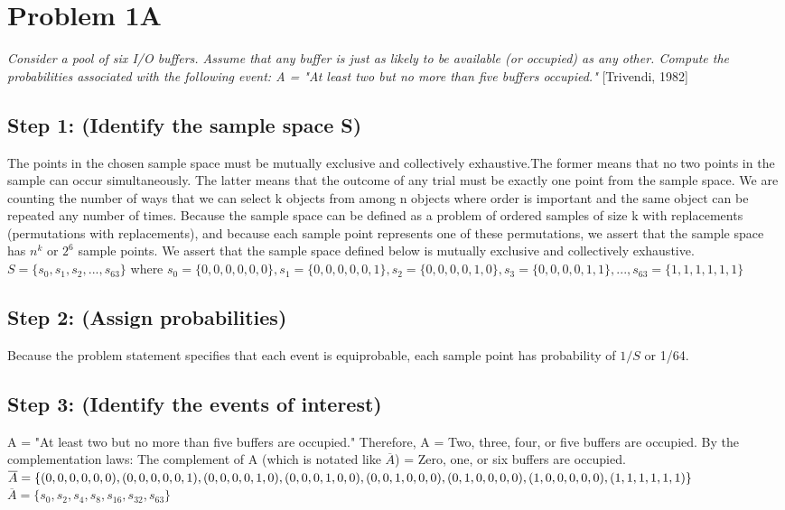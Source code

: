 \documentclass[a4paper,10pt]{article}
\title{}
\author{Mark Johnson \\
Loyola University Chicago}
\date {mjohnson4@luc.edu}
\begin{document}
\maketitle
\section{Problem 1A}
\emph{Consider a pool of six I/O buffers. Assume that any buffer is just as likely to be available (or occupied) as 
any other. Compute the probabilities associated with the following event: \newline
A = "At least two but no more than five buffers occupied."} [Trivendi, 1982]
\subsection{Step 1: (Identify the sample space S)}
The points in the chosen sample space must be mutually exclusive and collectively exhaustive.The former means that no 
two points in the sample can occur simultaneously. The latter means that the outcome of any trial must be exactly one 
point from the sample space. We are counting the number of ways that we can select k objects from among n objects 
where order is important and the same object can be repeated any number of times. Because the sample space can be 
defined as a problem of ordered samples of size k with replacements (permutations with replacements), and because 
each sample point represents one of these permutations, we assert that the sample space has $ n^{k} $ or $ 2^{6} $ 
sample points. We assert that the sample space defined below is mutually exclusive and collectively exhaustive. 
\newline
$ S = \{s_{0}, s_{1}, s_{2},..., s_{63}\} $ where \newline
$ s_{0} = \{0,0,0,0,0,0\}, s_{1} = \{0,0,0,0,0,1\}, s_{2} = \{0,0,0,0,1,0\}, s_{3} = \{0,0,0,0,1,1\},..., s_{63} = 
\{1,1,1,1,1,1\} $
\subsection{Step 2: (Assign probabilities)}
Because the problem statement specifies that each event is equiprobable, each sample point has probability of $ 1/S $ 
or 1/64.
\subsection{Step 3: (Identify the events of interest)}
A = "At least two but no more than five buffers are occupied." \newline
Therefore, A = Two, three, four, or five buffers are occupied. \newline
By the complementation laws: \newline
The complement of A (which is notated like $ \overline{A} $) = Zero, one, or six buffers are 
occupied. \newline
$ \overline{A} = \{(0,0,0,0,0,0), (0,0,0,0,0,1), (0,0,0,0,1,0), \newline
 (0,0,0,1,0,0), (0,0,1,0,0,0), (0,1,0,0,0,0), (1,0,0,0,0,0), (1,1,1,1,1,1)\} $ \newline
$ \overline{A} = \{s_{0}, s_{2}, s_{4}, s_{8}, s_{16}, s_{32}, s_{63}\} $
\end{document}
